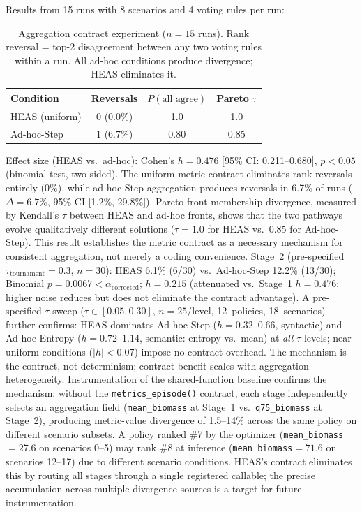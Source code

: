 \documentclass{wscpaperproc}
\begin{document}
Results from 15 runs with 8 scenarios and 4 voting rules per run:

\begin{table}[ht]
\centering\small
\caption{Aggregation contract experiment ($n\!=\!15$ runs). Rank reversal
= top-2 disagreement between any two voting rules within a run.
All ad-hoc conditions produce divergence; HEAS eliminates it.}
\label{tab:agg-control}
\begin{tabular}{lccc}
\toprule
Condition & Reversals & $P(\text{all agree})$ & Pareto $\tau$ \\
\midrule
HEAS (uniform) & 0 (0.0\%) & 1.0 & 1.0 \\
Ad-hoc-Step    & 1 (6.7\%) & 0.80 & 0.85 \\
\bottomrule
\end{tabular}
\end{table}

Effect size (HEAS vs.\ ad-hoc): Cohen's $h = 0.476$ [95\% CI: 0.211--0.680],
$p < 0.05$ (binomial test, two-sided). The uniform metric contract eliminates
rank reversals entirely (0\%), while ad-hoc-Step aggregation produces reversals in 6.7\%
of runs ($\Delta = 6.7\%$, 95\% CI [1.2\%, 29.8\%]). Pareto front membership divergence,
measured by Kendall's $\tau$ between HEAS and ad-hoc fronts, shows that the two
pathways evolve qualitatively different solutions ($\tau = 1.0$ for HEAS vs.\ 0.85 for
Ad-hoc-Step). This result establishes the metric contract as a necessary mechanism for consistent
aggregation, not merely a coding convenience. Stage~2 (pre-specified $\tau_\text{tournament}\!=\!0.3$, $n\!=\!30$): HEAS 6.1\% (6/30)
vs.\ Ad-hoc-Step 12.2\% (13/30); Binomial $p\!=\!0.0067 < \alpha_\text{corrected}$;
$h\!=\!0.215$ (attenuated vs.\ Stage~1 $h\!=\!0.476$: higher noise reduces but does
not eliminate the contract advantage). A pre-specified $\tau$-sweep ($\tau \in [0.05,
0.30]$, $n\!=\!25$/level, 12~policies, 18~scenarios) further confirms: HEAS dominates
Ad-hoc-Step ($h\!=\!0.32$--$0.66$, syntactic) and Ad-hoc-Entropy ($h\!=\!0.72$--$1.14$,
semantic: entropy vs.\ mean) at \emph{all} $\tau$ levels; near-uniform conditions
($|h|\!<\!0.07$) impose no contract overhead. The mechanism is the contract, not
determinism; contract benefit scales with aggregation heterogeneity.
Instrumentation of the shared-function baseline confirms the mechanism:
without the \texttt{metrics\_episode()} contract, each stage independently
selects an aggregation field (\texttt{mean\_biomass} at Stage~1 vs.\
\texttt{q75\_biomass} at Stage~2), producing metric-value divergence of
1.5--14\% across the same policy on different scenario subsets. A policy
ranked \#7 by the optimizer (\texttt{mean\_biomass}$\!=\!27.6$ on
scenarios 0--5) may rank \#8 at inference (\texttt{mean\_biomass}$\!=\!71.6$
on scenarios 12--17) due to different scenario conditions. HEAS's
contract eliminates this by routing all stages through a single registered
callable; the precise accumulation across multiple divergence sources is
a target for future instrumentation.
\end{document}

